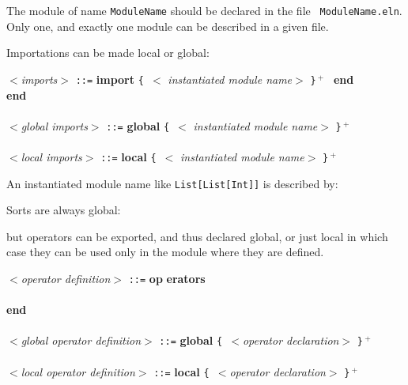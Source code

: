 The module of name {\tt ModuleName} should be declared in the file {\tt
ModuleName.eln}. Only one, and exactly one module can be described in
a given file. 

Importations can be made local or global: 

\begin{tabbing}
$<${\em imports}$>$ \= {\tt ::=} \= {\bf import} {\tt \{ $<$}{\em
instantiated module name}$>$ {\tt \}$^{~+}$ \sym{;}} {\bf end} \\
\>{\tt |}    {\bf 
end}\\\\
$<${\em global imports}$>$ \= {\tt ::=} \= {\bf global} {\tt \{ $<$}{\em 
instantiated module name}$>$ {\tt \}$^{~+}$ \sym{;}} \\\\
$<${\em local imports}$>$ \= {\tt ::=} \= {\bf local} {\tt \{ $<$}{\em 
instantiated module name}$>$ {\tt \}$^{~+}$ \sym{;}} \\
\end{tabbing}
An instantiated module name like \texttt{List[List[Int]]} is described 
by:


\noindent
Sorts are always global:

 {
   \sym{;}
}

\noindent
but operators can be exported, and thus declared global, or just local
in which case they can be used only in the module where they are defined.


\begin{tabbing}
{\tt $<$}{\em operator definition}{\tt $>$} \= {\tt ::=} \= {\bf op}\={\bf 
erators}\\
\>\>\>  \\
\>\> {\bf end} \\
\\
{\tt $<$}{\em global operator definition}{\tt $>$} \= {\tt ::=} \= {\bf 
global} {\tt \{ $<$}{\em operator declaration}{\tt $>$} {\tt \}$^{~+}$ \sym{;}} \\ 
\\
{\tt $<$}{\em local operator definition}{\tt $>$} \= {\tt ::=} \= {\bf 
local} {\tt \{ $<$}{\em operator declaration}{\tt $>$} {\tt \}$^{~+}$ \sym{;}} \\ 

\end{tabbing}

